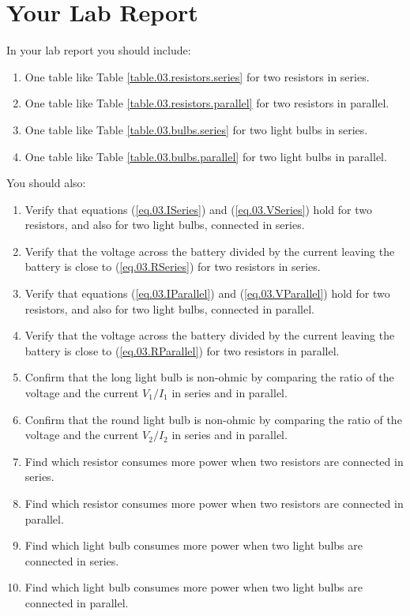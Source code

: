 \section{Your Lab Report}
%
In your lab report you should include:
\begin{enumerate}
	\item One table like Table \ref{table.03.resistors.series} for two resistors in series.
	\item One table like Table \ref{table.03.resistors.parallel} for two resistors in parallel.
	\item One table like Table \ref{table.03.bulbs.series} for two light bulbs in series.
	\item One table like Table \ref{table.03.bulbs.parallel} for two light bulbs in parallel.
\end{enumerate}
You should also:
\begin{enumerate}
	\item Verify that equations (\ref{eq.03.ISeries}) and (\ref{eq.03.VSeries}) hold for two resistors, and also for two light bulbs, connected in series.
	\item Verify that the voltage across the battery divided by the current leaving the battery is close to (\ref{eq.03.RSeries}) for two resistors in series.
	\item Verify that equations (\ref{eq.03.IParallel}) and (\ref{eq.03.VParallel}) hold for two resistors, and also for two light bulbs, connected in parallel.
	\item Verify that the voltage across the battery divided by the current leaving the battery is close to (\ref{eq.03.RParallel}) for two resistors in parallel.
	\item Confirm that the long light bulb is non-ohmic by comparing the ratio of the voltage and the current $V_{1} / I_{1}$ in series and in parallel.
	\item Confirm that the round light bulb is non-ohmic by comparing the ratio of the voltage and the current $V_{2} / I_{2}$ in series and in parallel.
	\item Find which resistor consumes more power when two resistors are connected in series.
	\item Find which resistor consumes more power when two resistors are connected in parallel.
	\item Find which light bulb consumes more power when two light bulbs are connected in series.
	\item Find which light bulb consumes more power when two light bulbs are connected in parallel.
\end{enumerate}
%
\newpage
